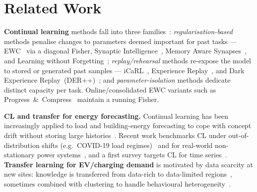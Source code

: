 \documentclass[conference]{IEEEtran}
\begin{document}
\section{Related Work}
\textbf{Continual learning} methods fall into three families~\cite{DeLange2021}:
\emph{regularisation-based} methods penalise changes to parameters deemed
important for past tasks --- EWC~\cite{Kirkpatrick2017} via a diagonal Fisher,
Synaptic Intelligence~\cite{Zenke2017}, Memory Aware Synapses~\cite{Aljundi2018},
and Learning without Forgetting~\cite{LiHoiem2017}; \emph{replay/rehearsal}
methods re-expose the model to stored or generated past samples ---
iCaRL~\cite{Rebuffi2017}, Experience Replay~\cite{Rolnick2019}, and Dark
Experience Replay~(DER++)~\cite{Buzzega2020}; and \emph{parameter-isolation}
methods dedicate distinct capacity per task. Online/consolidated EWC variants
such as Progress~\&~Compress~\cite{Schwarz2018} maintain a running Fisher.

\textbf{CL and transfer for energy forecasting.}
Continual learning has been increasingly applied to load and building-energy
forecasting to cope with concept drift without storing large
histories~\cite{ContLoadPartsCleaning2025,BuildingEnergyCL2023,OODLoadCovid2023}.
Recent work benchmarks CL under out-of-distribution shifts (e.g.\ COVID-19 load
regimes)~\cite{OODLoadCovid2023} and for real-world non-stationary power
systems~\cite{PracticalCLEnergy2026}, and a first survey targets CL for time
series~\cite{CLTimeSeriesSurvey2024}. \textbf{Transfer learning for EV/charging
demand} is motivated by data scarcity at new sites: knowledge is transferred from
data-rich to data-limited regions~\cite{EVTransferGaps2025}, sometimes combined
with clustering to handle behavioural heterogeneity~\cite{EVScarceCluster2025}.
\end{document}
